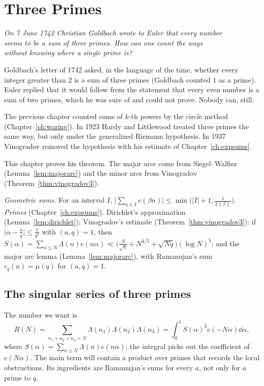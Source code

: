 \chapter{Three Primes}\label{ch:threeprimes}
\begin{center}\itshape
On 7 June 1742 Christian Goldbach wrote to Euler that every number\\
seems to be a sum of three primes. How can one count the ways\\
without knowing where a single prime is?
\end{center}

Goldbach's letter of 1742 asked, in the language of the time, whether every integer greater than $2$ is a sum of three primes (Goldbach counted $1$ as a prime). Euler replied that it would follow from the statement that every even number is a sum of two primes, which he was sure of and could not prove. Nobody can, still.

The previous chapter counted sums of $k$-th powers by the circle method (Chapter~\ref{ch:waring}). In 1923 Hardy and Littlewood treated three primes the same way, but only under the generalized Riemann hypothesis. In 1937 Vinogradov removed the hypothesis with his estimate of Chapter~\ref{ch:expsums}.

This chapter proves his theorem. The major arcs come from Siegel--Walfisz (Lemma~\ref{lem:majorarc}) and the minor arcs from Vinogradov (Theorem~\ref{thm:vinogradov3}).

\begin{reminder}
\emph{Geometric sums.} For an interval $I$, $\bigl|\sum_{n\in I}e(\beta n)\bigr|\le\min\bigl(|I|+1,\frac1{2\|\beta\|}\bigr)$.
\emph{Primes} (Chapter~\ref{ch:expsums}). Dirichlet's approximation (Lemma~\ref{lem:dirichlet}); Vinogradov's estimate (Theorem~\ref{thm:vinogradov3}): if $\bigl|\alpha-\frac aq\bigr|\le\frac1{q^2}$ with $(a,q)=1$, then $S(\alpha)=\sum_{n\le N}\Lambda(n)e(n\alpha)\ll\bigl(\frac N{\sqrt q}+N^{4/5}+\sqrt{Nq}\bigr)(\log N)^5$; and the major arc lemma (Lemma~\ref{lem:majorarc}), with Ramanujan's sum $c_q(a)=\mu(q)$ for $(a,q)=1$.
\end{reminder}

\section{The singular series of three primes}

The number we want is
\[
R(N)=\sum_{n_1+n_2+n_3=N}\Lambda(n_1)\Lambda(n_2)\Lambda(n_3)=\int_0^1S(\alpha)^3e(-N\alpha)\dd\alpha,
\]
where $S(\alpha)=\sum_{n\le N}\Lambda(n)e(n\alpha)$; the integral picks out the coefficient of $e(N\alpha)$. The main term will contain a product over primes that records the local obstructions. Its ingredients are Ramanujan's sums for every $a$, not only for $a$ prime to $q$.


